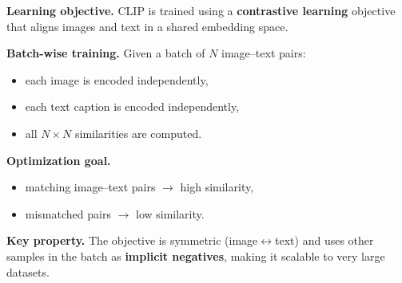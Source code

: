 \textbf{Learning objective.}
CLIP is trained using a \textbf{contrastive learning} objective
that aligns images and text in a shared embedding space.

\textbf{Batch-wise training.}
Given a batch of \(N\) image--text pairs:
\begin{itemize}
    \item each image is encoded independently,
    \item each text caption is encoded independently,
    \item all \(N \times N\) similarities are computed.
\end{itemize}

\textbf{Optimization goal.}
\begin{itemize}
    \item matching image--text pairs $\rightarrow$ high similarity,
    \item mismatched pairs $\rightarrow$ low similarity.
\end{itemize}

\textbf{Key property.}
The objective is symmetric (image$\leftrightarrow$text)
and uses other samples in the batch as \textbf{implicit negatives},
making it scalable to very large datasets.
